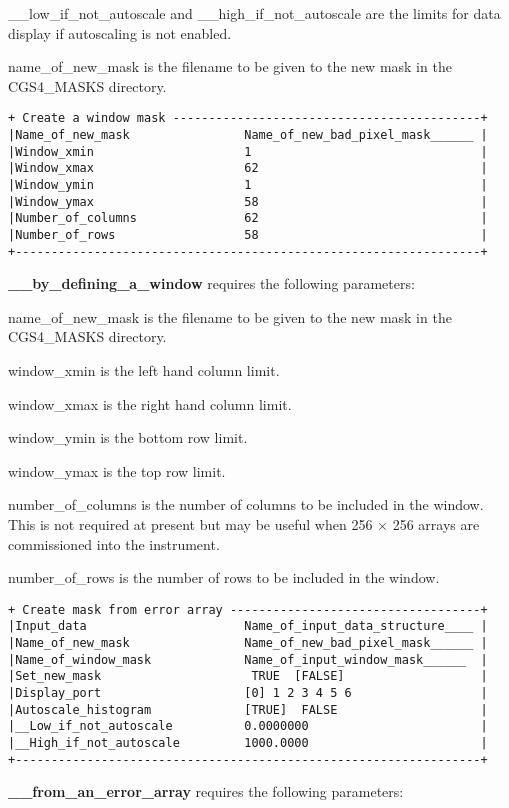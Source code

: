 {{\sf \_\_low\_if\_not\_autoscale} and {\sf \_\_high\_if\_not\_autoscale}
are the limits for data display if autoscaling is not enabled.

{\sf name\_of\_new\_mask} is the filename to be given to the new mask
in the {\sf CGS4\_MASKS} directory.

\begin{verbatim}
+ Create a window mask -------------------------------------------+
|Name_of_new_mask                Name_of_new_bad_pixel_mask______ |
|Window_xmin                     1                                |
|Window_xmax                     62                               |
|Window_ymin                     1                                |
|Window_ymax                     58                               |
|Number_of_columns               62                               |
|Number_of_rows                  58                               |
+-----------------------------------------------------------------+
\end{verbatim}
{\bf \_\_by\_defining\_a\_window} requires the following parameters:

{\sf name\_of\_new\_mask} is the filename to be given to the new mask
in the {\sf CGS4\_MASKS} directory.

{\sf window\_xmin} is the left hand column limit.

{\sf window\_xmax} is the right hand column limit.

{\sf window\_ymin} is the bottom row limit.

{\sf window\_ymax} is the top row limit.

{\sf number\_of\_columns} is the number of columns to be included in the
window. This is not required at present but may be useful when 
256 $\times$ 256 arrays are commissioned into the instrument.

{\sf number\_of\_rows} is the number of rows to be included in the window.

\begin{verbatim}
+ Create mask from error array -----------------------------------+
|Input_data                      Name_of_input_data_structure____ |
|Name_of_new_mask                Name_of_new_bad_pixel_mask______ |
|Name_of_window_mask             Name_of_input_window_mask______  |
|Set_new_mask                     TRUE  [FALSE]                   |
|Display_port                    [0] 1 2 3 4 5 6                  |
|Autoscale_histogram             [TRUE]  FALSE                    |
|__Low_if_not_autoscale          0.0000000                        |
|__High_if_not_autoscale         1000.0000                        |
+-----------------------------------------------------------------+
\end{verbatim}
{\bf \_\_from\_an\_error\_array} requires the following parameters:

}
